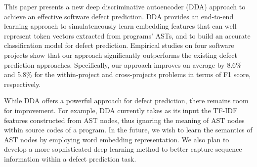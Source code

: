 
This paper presents a new deep  discriminative autoencoder (DDA) approach to achieve an effective software defect prediction. DDA provides an end-to-end learning approach to simulateneously learn embedding features that can well represent token vectors extracted from programs' ASTs, and to build an accurate classification model for defect prediction. Empirical studies on four software projects show that our approach significantly outperforms the existing defect prediction approaches. Specifically, our approach improves on average by 8.6\% and 5.8\% for the within-project and cross-projects problems in terms of F1 score, respectively. 

While DDA offers a powerful approach for defect prediction, there remains room for improvement. For example, DDA currently takes as its input the TF-IDF features constructed from AST nodes, thus ignoring the meaning of AST nodes within source codes of a program. In the future, we wish to learn the semantics of AST nodes by employing word embedding representation. We also plan to develop a more sophisticated deep learning method to better capture sequence information within a defect prediction task. 

%

